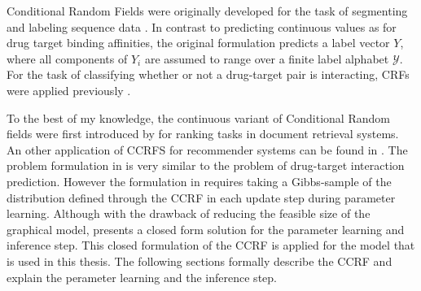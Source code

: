 Conditional Random Fields were originally developed for the task of segmenting and labeling sequence data \cite{lafferty2001conditional}. In contrast to predicting continuous values as for drug target binding affinities, the original formulation predicts a label vector $Y$, where all components of $Y_i$ are assumed to range over a finite label alphabet $\mathcal{Y}$. For the task of classifying whether or not a drug-target pair is interacting, CRFs were applied previously \cite{yang2014drug}.


To the best of my knowledge, the continuous variant of Conditional Random fields were first introduced by \cite{qin2009global} for ranking tasks in document retrieval systems. An other application of CCRFS for recommender systems can be found in \cite{xin2009social}. The problem formulation in \cite{xin2009social} is very similar to the problem of drug-target interaction prediction. However the formulation in \cite{xin2009social} requires taking a Gibbs-sample of the distribution defined through the CCRF in each update step during parameter learning. Although with the drawback of reducing the feasible size of the graphical model, \cite{baltruvsaitis2013dimensional} presents a closed form solution for the parameter learning and inference step. This closed formulation of the CCRF is applied for the model that is used in this thesis. The following sections formally describe the CCRF and explain the perameter learning and the inference step.






